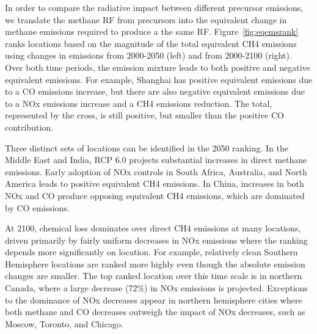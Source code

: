 In order to compare the radiative impact between different precursor emissions, we translate the methane RF from precursors into the equivalent change in methane emissions required to produce a the same RF. Figure~\ref{fig:eqemsrank} ranks locations based on the magnitude of the total equivalent CH4 emissions using changes in emissions from 2000-2050 (left) and from 2000-2100 (right). Over both time periods, the emission  mixture leads to both  positive and negative equivalent emissions. For example, Shanghai has positive equivalent emissions due to a CO emissions increase, but there are also negative equivalent emissions due to a NOx emissions increase and a CH4 emissions reduction. The total, represented by the cross, is still positive, but smaller than the positive CO contribution.

Three distinct sets of locations can be identified in the 2050 ranking. In the Middle East and India, RCP 6.0 projects substantial increases in direct methane emissions. Early adoption of NOx controls in South Africa, Australia, and North America leads to positive equivalent CH4 emissions. In China, increases in both NOx and CO produce opposing equivalent CH4 emissions, which are dominated by  CO emissions.

At 2100, chemical loss dominates over direct CH4 emissions at many locations, driven primarily by fairly uniform decreases in NOx emissions where the ranking depends more significantly on location. For example,  relatively clean Southern Hemisphere locations are ranked more highly even though the absolute emission changes are smaller. The top ranked location over this time scale is in northern Canada, where a large decrease (72\%) in NOx emissions is projected. Exceptions to the dominance of NOx decreases appear in northern hemisphere cities where both methane and CO decreases outweigh the impact of NOx decreases, such as Moscow, Toronto, and Chicago. 

